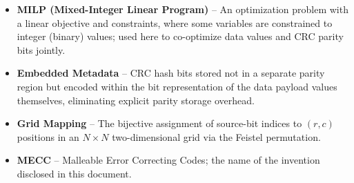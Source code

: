 \begin{itemize}
    \item \textbf{MILP (Mixed-Integer Linear Program)} -- An optimization problem with a linear objective and constraints, where some variables are constrained to integer (binary) values; used here to co-optimize data values and CRC parity bits jointly.
    \item \textbf{Embedded Metadata} -- CRC hash bits stored not in a separate parity region but encoded within the bit representation of the data payload values themselves, eliminating explicit parity storage overhead.
    \item \textbf{Grid Mapping} -- The bijective assignment of source-bit indices to $(r, c)$ positions in an $N \times N$ two-dimensional grid via the Feistel permutation.
    \item \textbf{MECC} -- Malleable Error Correcting Codes; the name of the invention disclosed in this document.
\end{itemize}
